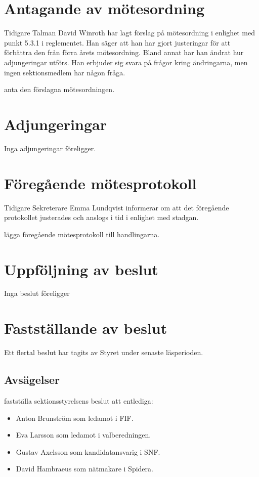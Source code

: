 \documentclass[hidelinks]{../sektionsmote} %
\begin{document}
\section{Antagande av mötesordning}
Tidigare Talman David Winroth har lagt förslag på mötesordning i enlighet med punkt 5.3.1 i reglementet.
Han säger att han har gjort justeringar för att förbättra den från förra årets mötesordning.
Bland annat har han ändrat hur adjungeringar utförs.
Han erbjuder sig svara på frågor kring ändringarna, men ingen sektionsmedlem har någon fråga.
\begin{beslut}
    \item anta den förslagna mötesordningen.
\end{beslut}

\section{Adjungeringar}
Inga adjungeringar föreligger.


\section{Föregående mötesprotokoll}
Tidigare Sekreterare Emma Lundqvist informerar om att det föregående protokollet justerades och anslogs i tid i enlighet med stadgan.
\begin{beslut}
    \item lägga föregående mötesprotokoll till handlingarna. 
\end{beslut}


\section{Uppföljning av beslut}
Inga beslut föreligger


\section{Fastställande av beslut}
Ett flertal beslut har tagits av Styret under senaste läsperioden.

\subsection{Avsägelser}
\begin{beslut}
    \item fastställa sektionsstyrelsens beslut att entlediga:
    \begin{itemize}
        \item Anton Brunström som ledamot i FIF.
        \item Eva Larsson som ledamot i valberedningen.
        \item Gustav Axelsson som kandidatansvarig i SNF.
        \item David Hambraeus som nätmakare i Spidera.
    \end{itemize}
\end{beslut}
\end{document}
